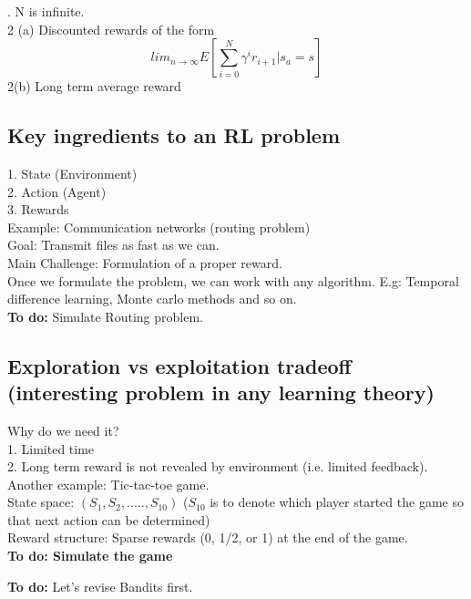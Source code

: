 \documentclass{book}
\begin{document}
. N is infinite.\\
2 (a) Discounted rewards of the form
$$
lim_{n \rightarrow \infty} E[\sum_{i = 0}^{N} \gamma^{i} r_{i+1}| s_{a} = s]
$$
2(b) Long term average reward\\

\subsection{Key ingredients to an RL problem}
1. State (Environment)\\
2. Action (Agent)\\
3. Rewards\\

\noindent Example: Communication networks (routing problem)\\
Goal: Transmit files as fast as we can.\\
Main Challenge: Formulation of a proper reward.\\
Once we formulate the problem, we can work with any algorithm. E.g: Temporal difference learning, Monte carlo methods and so on.\\
\textbf{To do:} Simulate Routing problem.

\subsection{Exploration vs exploitation tradeoff (interesting problem in any learning theory)}
Why do we need it? \\
1. Limited time\\
2. Long term reward is not revealed by environment (i.e. limited feedback).\\

Another example: Tic-tac-toe game.\\
State space: $(S_{1}, S_{2}, ....., S_{10})$
($S_{10}$  is to denote which player started the game so that next action can be determined)\\
Reward structure: Sparse rewards (0, 1/2, or 1) at the end of the game.\\
\textbf{To do: Simulate the game}

\textbf{To do:} Let's revise Bandits first.
\end{document}
